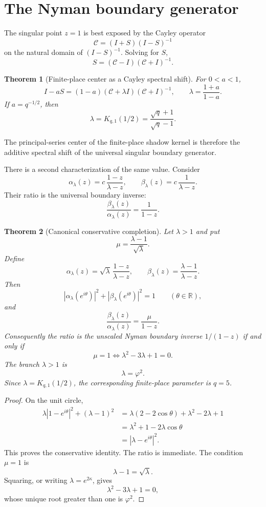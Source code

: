 \documentclass[11pt]{article}
\newtheorem{theorem}{Theorem}[section]
\theoremstyle{definition}
\theoremstyle{remark}
\newcommand{\R}{\mathbb R}
\begin{document}
\section{The Nyman boundary generator}

The singular point \(z=1\) is best exposed by the Cayley operator
\[
\mathcal C=(I+S)(I-S)^{-1}
\]
on the natural domain of \((I-S)^{-1}\).  Solving for \(S\),
\[
S=(\mathcal C-I)(\mathcal C+I)^{-1}.
\]

\begin{theorem}[Finite-place center as a Cayley spectral shift]
For \(0<a<1\),
\[
I-aS
=
(1-a)(\mathcal C+\lambda I)(\mathcal C+I)^{-1},
\qquad
\lambda=\frac{1+a}{1-a}.
\]
If \(a=q^{-1/2}\), then
\[
\boxed{
\lambda=K_{q,1}(1/2)
=\frac{\sqrt q+1}{\sqrt q-1}.
}
\]
\end{theorem}

The principal-series center of the finite-place shadow kernel is therefore the additive spectral shift of the universal singular boundary generator.

There is a second characterization of the same value.  Consider
\[
\alpha_\lambda(z)
=c\,\frac{1-z}{\lambda-z},
\qquad
\beta_\lambda(z)
=c\,\frac1{\lambda-z}.
\]
Their ratio is the universal boundary inverse:
\[
\frac{\beta_\lambda(z)}{\alpha_\lambda(z)}
=\frac1{1-z}.
\]

\begin{theorem}[Canonical conservative completion]
Let \(\lambda>1\) and put
\[
\mu=\frac{\lambda-1}{\sqrt\lambda}.
\]
Define
\[
\alpha_\lambda(z)
=
\sqrt\lambda\,\frac{1-z}{\lambda-z},
\qquad
\beta_\lambda(z)
=
\frac{\lambda-1}{\lambda-z}.
\]
Then
\[
\boxed{
|\alpha_\lambda(e^{i\theta})|^2
+
|\beta_\lambda(e^{i\theta})|^2
=1
}
\qquad(\theta\in\R),
\]
and
\[
\boxed{
\frac{\beta_\lambda(z)}{\alpha_\lambda(z)}
=
\frac{\mu}{1-z}.
}
\]
Consequently the ratio is the unscaled Nyman boundary inverse \(1/(1-z)\) if and only if
\[
\mu=1
\iff
\lambda^2-3\lambda+1=0.
\]
The branch \(\lambda>1\) is
\[
\boxed{
\lambda=\varphi^2.
}
\]
Since \(\lambda=K_{q,1}(1/2)\), the corresponding finite-place parameter is \(q=5\).
\end{theorem}

\begin{proof}
On the unit circle,
\begin{align*}
\lambda|1-e^{i\theta}|^2+(\lambda-1)^2
&=\lambda(2-2\cos\theta)+\lambda^2-2\lambda+1\\
&=\lambda^2+1-2\lambda\cos\theta\\
&=|\lambda-e^{i\theta}|^2.
\end{align*}
This proves the conservative identity.  The ratio is immediate.  The condition \(\mu=1\) is
\[
\lambda-1=\sqrt\lambda.
\]
Squaring, or writing \(\lambda=e^{2\kappa}\), gives
\[
\lambda^2-3\lambda+1=0,
\]
whose unique root greater than one is \(\varphi^2\).
\end{proof}
\end{document}
